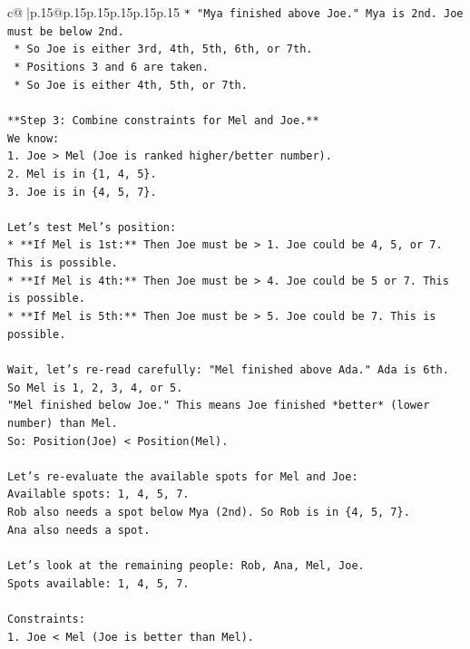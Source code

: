 \documentclass{article}
\begin{document}
{\begin{supertabular}{c@{$\;$}|p{.15\linewidth}@{}p{.15\linewidth}p{.15\linewidth}p{.15\linewidth}p{.15\linewidth}p{.15\linewidth}}
{{{\texttt{*   "Mya finished above Joe." Mya is 2nd. Joe must be below 2nd.} \\
\texttt{    *   So Joe is either 3rd, 4th, 5th, 6th, or 7th.} \\
\texttt{    *   Positions 3 and 6 are taken.} \\
\texttt{    *   So Joe is either 4th, 5th, or 7th.} \\
\\ 
\texttt{**Step 3: Combine constraints for Mel and Joe.**} \\
\texttt{We know:} \\
\texttt{1.  Joe > Mel (Joe is ranked higher/better number).} \\
\texttt{2.  Mel is in \{1, 4, 5\}.} \\
\texttt{3.  Joe is in \{4, 5, 7\}.} \\
\\ 
\texttt{Let's test Mel's position:} \\
\texttt{*   **If Mel is 1st:** Then Joe must be > 1. Joe could be 4, 5, or 7. This is possible.} \\
\texttt{*   **If Mel is 4th:** Then Joe must be > 4. Joe could be 5 or 7. This is possible.} \\
\texttt{*   **If Mel is 5th:** Then Joe must be > 5. Joe could be 7. This is possible.} \\
\\ 
\texttt{Wait, let's re{-}read carefully: "Mel finished above Ada." Ada is 6th. So Mel is 1, 2, 3, 4, or 5.} \\
\texttt{"Mel finished below Joe." This means Joe finished *better* (lower number) than Mel.} \\
\texttt{So: Position(Joe) < Position(Mel).} \\
\\ 
\texttt{Let's re{-}evaluate the available spots for Mel and Joe:} \\
\texttt{Available spots: 1, 4, 5, 7.} \\
\texttt{Rob also needs a spot below Mya (2nd). So Rob is in \{4, 5, 7\}.} \\
\texttt{Ana also needs a spot.} \\
\\ 
\texttt{Let's look at the remaining people: Rob, Ana, Mel, Joe.} \\
\texttt{Spots available: 1, 4, 5, 7.} \\
\\ 
\texttt{Constraints:} \\
\texttt{1.  Joe < Mel (Joe is better than Mel).} \\
}}}
\end{supertabular}}
\end{document}
